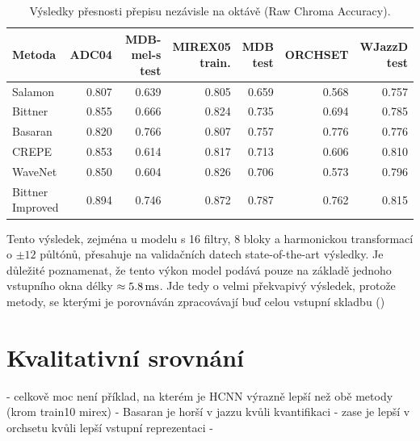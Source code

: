 \begin{table}[h!]
\centering

\begin{tabular}{lrrrrrr}
\toprule
              Metoda & ADC04 & \shortstack[r]{MDB-mel-s \\ test} & \shortstack[r]{MIREX05\\train.} & \shortstack[r]{MDB\\test} & ORCHSET & \shortstack[r]{WJazzD\\test} \\
\midrule
        Salamon & 0.807 &                 0.639 &          0.805 &         0.659 &   0.568 &       0.757 \\
        Bittner & 0.855 &                 0.666 &          0.824 &         0.735 &   0.694 &       0.785 \\
        Basaran & 0.820 &                 0.766 &          0.807 &         0.757 &   0.776 &       0.776 \\
          CREPE & 0.853 &                 0.614 &          0.817 &         0.713 &   0.606 &       0.810 \\
        WaveNet & 0.850 &                 0.604 &          0.826 &         0.706 &   0.573 &       0.796 \\
 \shortstack[r]{Bittner\\Improved}   & 0.894 &                 0.746 &          0.872 &         0.787 &   0.762 &       0.815 \\
\bottomrule
\end{tabular}

\caption{Výsledky přesnosti přepisu nezávisle na oktávě (Raw Chroma Accuracy).}\label{tab:vysledky_RCA}
\end{table}

Tento výsledek, zejména u modelu s 16 filtry, 8 bloky a harmonickou transformací o $\pm 12$ půltónů, přesahuje na validačních datech state-of-the-art výsledky. Je důležité poznamenat, že tento výkon model podává pouze na základě jednoho vstupního okna délky $\approx 5.8\,\rm ms$. Jde tedy o velmi překvapivý výsledek, protože metody, se kterými je porovnáván zpracovávají buď celou vstupní skladbu ()



\section{Kvalitativní srovnání}

- celkově moc není příklad, na kterém je HCNN výrazně lepší než obě metody (krom train10 mirex)
- Basaran je horší v jazzu kvůli kvantifikaci
- zase je lepší v orchsetu kvůli lepší vstupní reprezentaci
- 

